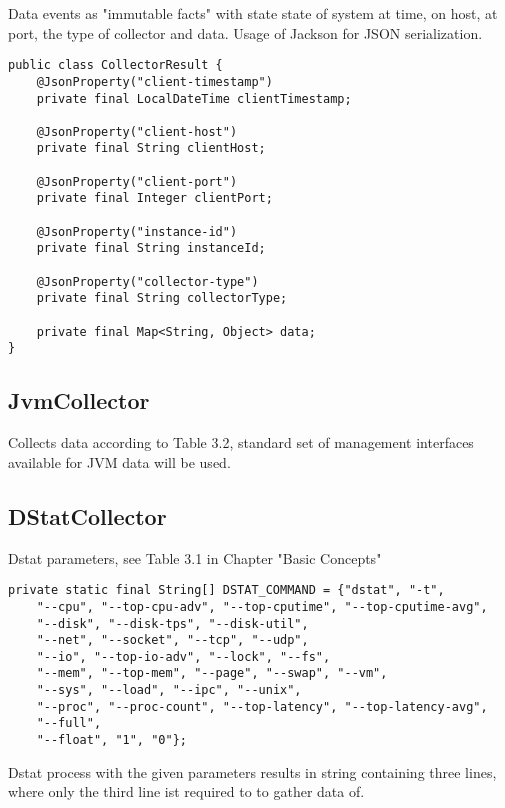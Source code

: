 Data events as "immutable facts" with state state of system at time, on host, at port, the type of collector and data.
Usage of Jackson for JSON serialization.

\begin{lstlisting}[caption={CollectorResult}, captionpos=b, label={lst:collectortypesimpl}]
public class CollectorResult {
    @JsonProperty("client-timestamp")
    private final LocalDateTime clientTimestamp;

    @JsonProperty("client-host")
    private final String clientHost;

    @JsonProperty("client-port")
    private final Integer clientPort;

    @JsonProperty("instance-id")
    private final String instanceId;

    @JsonProperty("collector-type")
    private final String collectorType;

    private final Map<String, Object> data;
}
\end{lstlisting}

\subsection{JvmCollector}

Collects data according to Table 3.2, standard set of management interfaces available for JVM data will be used.

\subsection{DStatCollector}

Dstat parameters, see Table 3.1 in Chapter "Basic Concepts"

\begin{lstlisting}[caption={Dstat program parameters in "DstatCollector"}, captionpos=b, label={lst:dstatparameters}]
private static final String[] DSTAT_COMMAND = {"dstat", "-t",
    "--cpu", "--top-cpu-adv", "--top-cputime", "--top-cputime-avg",
    "--disk", "--disk-tps", "--disk-util",
    "--net", "--socket", "--tcp", "--udp",
    "--io", "--top-io-adv", "--lock", "--fs",
    "--mem", "--top-mem", "--page", "--swap", "--vm",
    "--sys", "--load", "--ipc", "--unix",
    "--proc", "--proc-count", "--top-latency", "--top-latency-avg",
    "--full",
    "--float", "1", "0"};
\end{lstlisting}

Dstat process with the given parameters results in string containing three lines, where only the third line ist required to
to gather data of.

